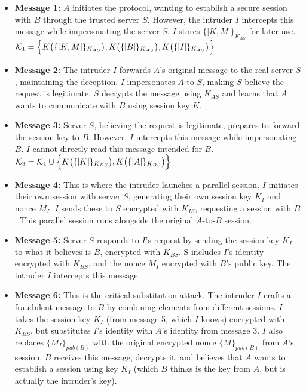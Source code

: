 \documentclass[11pt]{article}
\begin{document}
    \begin{itemize}
        \item \textbf{Message 1:} $A$ initiates the protocol, wanting to establish a secure session with $B$ through
                the trusted server $S$. However, the intruder $I$ intercepts this message while
                 impersonating the server $S$. $I$ stores $\{| K, M |\}_{K_{AS}}$ for later use.
                $\mathcal{K}_1 = \Bigl\{ K\bigl(\{| K, M |\}_{K_{AS}}\bigr), K\bigl(\{|B|\}_{K_{AS}}\bigr), K\bigl(\{|I|\}_{K_{AS}}\bigr) \Bigr\}$

        \item \textbf{Message 2:} The intruder $I$ forwards $A$'s original message to the real server $S$, maintaining
                the deception. $I$ impersonates $A$ to $S$, making $S$ believe the request is legitimate. $S$ decrypts
                the message using $K_{AS}$ and learns that $A$ wants to communicate with $B$ using session key $K$.


        \item \textbf{Message 3:} Server $S$, believing the request is legitimate, prepares to forward the session key
                to $B$. However, $I$ intercepts this message while impersonating $B$. $I$ cannot directly read this
                message intended for $B$.
                $\mathcal{K}_3 = \mathcal{K}_1 \cup \Bigl\{ K\bigl( \{| K |\}_{K_{BS}}\bigr),  K\bigl(\{|A|\}_{K_{BS}}\bigr) \Bigr\}$




        \item \textbf{Message 4:} This is where the intruder launches a parallel session. $I$ initiates their own
                session with server $S$, generating their own session key $K_I$ and nonce $M_I$. $I$ sends these to $S$
                encrypted with $K_{IS}$, requesting a session with $B$. This parallel session runs alongside the original
                $A$-to-$B$ session.

        \item \textbf{Message 5:} Server $S$ responds to $I$'s request by sending the session key $K_I$ to what it
                believes is $B$, encrypted with $K_{BS}$. S includes $I$'s identity encrypted with $K_{BS}$, and the
                nonce $M_I$ encrypted with $B$'s public key. The intruder $I$ intercepts this message.

        \item \textbf{Message 6:} This is the critical substitution attack. The intruder $I$ crafts a fraudulent message
                to $B$ by combining elements from different sessions. $I$ takes the session key $K_I$ (from message 5,
                which $I$ knows) encrypted with $K_{BS}$, but substitutes $I$'s identity with $A$'s identity from message 3.
                $I$ also replaces $\{M_I\}_{pub(B)}$ with the original encrypted nonce $\{M\}_{pub(B)}$ from $A$'s session.
                $B$ receives this message, decrypts it, and believes that $A$ wants to establish a session using key
                $K_I$ (which $B$ thinks is the key from $A$, but is actually the intruder's key).


\end{itemize}
\end{document}
